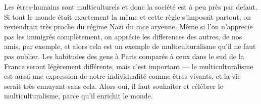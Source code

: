 \documentclass[12pt,a4paper]{article}
\begin{document}
Les êtres-humains sont multiculturels et donc la société est à peu près par defaut. Si tout le monde était exactement la même et cette règle s'imposait partout, on reviendrait très proche du régime Nazi du race aryenne. Même si l'on n'apprecie pas les immigrés complètement, on apprécie les differences des autres, de nos amis, par exemple, et alors cela est un exemple de multiculturalisme qu'il ne faut pas oublier. Les habitudes des gens à Paris comparés à ceux dans le sud de la France seront légèrement différents, mais c'est important --- le multiculturalisme est aussi une expression de notre individualité comme êtres vivants, et la vie serait très ennuyant sans cela. Alors oui, il faut souhaiter et célébrer le multiculturalisme, parce qu'il enrichit le monde.\\
\end{document}
